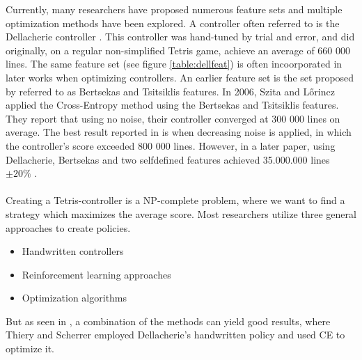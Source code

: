 Currently, many researchers have proposed numerous 
feature sets and multiple 
optimization methods have been explored. 
A controller often referred to is the Dellacherie controller 
\citep{fahey}. This controller was hand-tuned by trial and error,
and did originally, on a regular non-simplified Tetris game, achieve an average of
660 000 lines. The same feature set (see figure \ref{table:dellfeat}) is 
often incoorporated in later works when optimizing controllers. An earlier
feature set is the set proposed by \citep{Bertsekas} referred to as Bertsekas and
Tsitsiklis features. In 2006, Szita and L\H{o}rincz \citep{szita:06} applied the Cross-Entropy
method using the Bertsekas and Tsitsiklis features. They report that using no noise,
their controller converged at 300 000 lines on average. 
The best result reported in \citep{szita:06}
is when decreasing noise is applied, 
in which the controller's score exceeded 800 000 lines. 
However, in a later paper, using Dellacherie, 
Bertsekas and two selfdefined features achieved 
35.000.000 lines $\pm 20\%$  \citep{scherrer2009}.\\
\\
Creating a Tetris-controller is a NP-complete problem, 
where we want to find a strategy which maximizes 
the average score. Most researchers utilize three 
general approaches to create policies.

\begin{itemize}
\item Handwritten controllers
\item Reinforcement learning approaches
\item Optimization algorithms
\end{itemize}

But as seen in \citep{scherrer2009}, 
a combination of the methods can yield good results, 
where Thiery and Scherrer employed Dellacherie's 
handwritten policy and used CE to optimize it.

